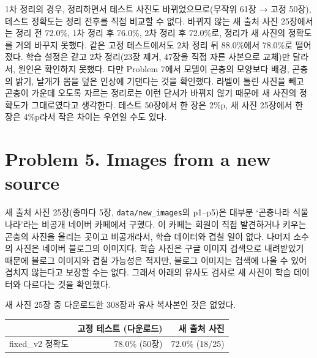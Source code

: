 \documentclass[11pt]{article}
\begin{document}
1차 정리의 경우, 정리하면서 테스트 사진도 바뀌었으므로(무작위 61장 → 고정 50장), 테스트 정확도는 정리 전후를 직접 비교할 수 없다. 바뀌지 않는 새 출처 사진 25장에서는 정리 전 72.0\%, 1차 정리 후 76.0\%, 2차 정리 후 72.0\%로, 정리가 새 사진의 정확도를 거의 바꾸지 못했다. 같은 고정 테스트에서도 2차 정리 뒤 88.0\%에서 78.0\%로 떨어졌다. 학습 설정은 같고 2차 정리(23장 제거, 47장을 직접 자른 사본으로 교체)만 달라서, 원인은 확인하지 못했다. 다만 Problem 7에서 모델이 곤충의 모양보다 배경, 곤충의 밝기, 날개가 몸을 덮은 인상에 기댄다는 것을 확인했다. 라벨이 틀린 사진을 빼고 곤충이 가운데 오도록 자르는 정리로는 이런 단서가 바뀌지 않기 때문에 새 사진의 정확도가 그대로였다고 생각한다. 테스트 50장에서 한 장은 2\%p, 새 사진 25장에서 한 장은 4\%p라서 작은 차이는 우연일 수도 있다.

\section*{Problem 5. Images from a new source}

새 출처 사진 25장(종마다 5장, \texttt{data/new\_images}의 p1--p5)은 대부분 `곤충나라 식물나라'라는 비공개 네이버 카페에서 구했다. 이 카페는 회원이 직접 발견하거나 키우는 곤충의 사진을 올리는 곳이고 비공개라서, 학습 데이터와 겹칠 일이 없다. 나머지 소수의 사진은 네이버 블로그의 이미지다. 학습 사진은 구글 이미지 검색으로 내려받았기 때문에 블로그 이미지와 겹칠 가능성은 적지만, 블로그 이미지는 검색에 나올 수 있어 겹치지 않는다고 보장할 수는 없다. 그래서 아래의 유사도 검사로 새 사진이 학습 데이터와 다르다는 것을 확인했다.

새 사진 25장 중 다운로드한 308장과 유사 복사본인 것은 없었다.

\begin{center}\footnotesize
\begin{tabular}{lrr}
\toprule
& 고정 테스트 (다운로드) & 새 출처 사진 \\
\midrule
fixed\_v2 정확도 & 78.0\% (50장) & 72.0\% (18/25) \\
\bottomrule
\end{tabular}
\end{center}

\end{document}

